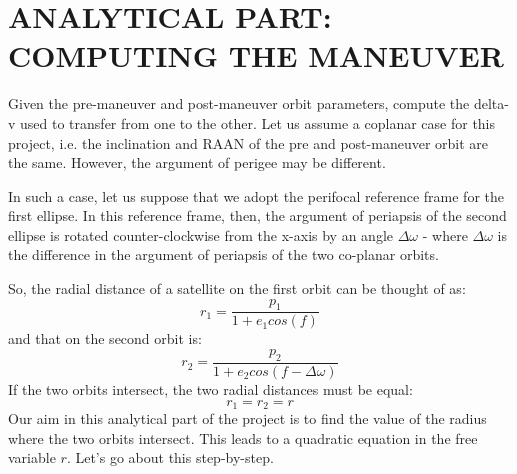 \documentclass[12pt, letterpaper]{aiaa-tc}
\begin{document}
\section{ANALYTICAL PART: COMPUTING THE MANEUVER}

Given the pre-maneuver and post-maneuver orbit parameters, compute the delta-v used to transfer from one to the
other. Let us assume a coplanar case for this project, i.e. the inclination and RAAN of the pre and post-maneuver
orbit are the same. However, the argument of perigee may be different.

In such a case, let us suppose that we adopt the perifocal reference frame for the first ellipse. In this reference
frame, then, the argument of periapsis of the second ellipse is rotated counter-clockwise from the x-axis by an
angle $\Delta\omega$ - where $\Delta\omega$ is the difference in the argument of periapsis of the two co-planar orbits.

So, the radial distance of a satellite on the first orbit can be thought of as:
\begin{equation}
    r_1=\frac{p_1}{1+e_1 cos(f)}
    \label{eq:orbitequation1}
\end{equation}
and that on the second orbit is:
\begin{equation}
    r_2=\frac{p_2}{1+e_2 cos(f-\Delta\omega)}
    \label{eq:orbitequation2}
\end{equation}
If the two orbits intersect, the two radial distances must be equal:
\[ r_1=r_2=r \]
Our aim in this analytical part of the project is to find the value of the radius where the two orbits intersect. This
leads to a quadratic equation in the free variable $r$. Let's go about this step-by-step.
\end{document}
